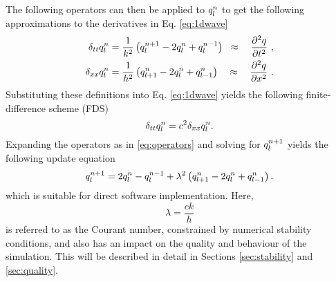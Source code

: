 The following operators can then be applied to $q_l^n$ to get the following approximations to the derivatives in Eq. \eqref{eq:1dwave}
\begin{subequations}\label{eq:operators}
    \begin{align}
         \delta_{tt}q_l^n &= \frac{1}{k^2}\left(q_l^{n+1}-2q_l^n + q_l^{n-1}\right)\;\;\approx\quad\frac{\partial^2q}{\partial t^2}\label{eq:secondOrderTime}\ ,\\
         \delta_{xx}q_l^n &= \frac{1}{h^2}\left(q_{l+1}^n-2q_l^n + q_{l-1}^n\right)\quad\approx\quad \frac{\partial^2q}{\partial x^2}\ .\label{eq:secondOrderSpace}
    \end{align}
\end{subequations}
Substituting these definitions into Eq. \eqref{eq:1dwave} yields the following finite-difference scheme (FDS)
\begin{equation}\label{eq:FDS}
    \delta_{tt}q_l^n = c^2 \delta_{xx}q_l^n.
\end{equation}
%
Expanding the operators as in %
\eqref{eq:operators} and solving for $q_l^{n+1}$ yields the following update equation
\begin{equation}\label{eq:updateEq}
    q_l^{n+1} = 2q_l^n-q_l^{n-1} + \lambda^2 \left(q_{l+1}^n-2q_l^n + q_{l-1}^n\right).
\end{equation}
which is suitable for direct software implementation. %
Here,
\begin{equation}\label{eq:lambdaDef}
    \lambda = \frac{ck}{h}
\end{equation}
is referred to as the Courant number, constrained by numerical stability conditions, and also has an impact on the quality and behaviour of the simulation. This will be described in detail in Sections \ref{sec:stability} and \ref{sec:quality}.

